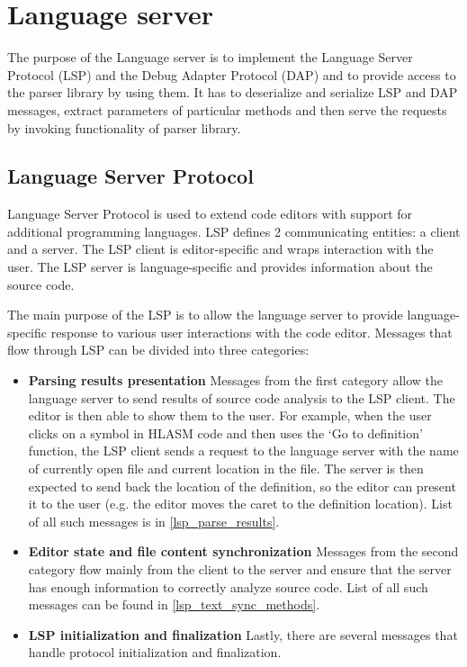 \chapter{Language server}
\label{chap:lang_server}
The purpose of the Language server is to implement the Language Server Protocol (LSP) and the Debug Adapter Protocol (DAP) and to provide access to the parser library by using them. It has to deserialize and serialize LSP and DAP messages, extract parameters of particular methods and then serve the requests by invoking functionality of parser library.

\section{Language Server Protocol}
Language Server Protocol is used to extend code editors with support for additional programming languages. LSP defines 2 communicating entities: a client and a server. The LSP client is editor-specific and wraps interaction with the user. The LSP server is language-specific and provides information about the source code.

The main purpose of the LSP is to allow the language server to provide language-specific response to various user interactions with the code editor. Messages that flow through LSP can be divided into three categories:

\begin{itemize}
	\item \textbf{Parsing results presentation} Messages from the first category allow the language server to send results of source code analysis to the LSP client. The editor is then able to show them to the user. For example, when the user clicks on a symbol in HLASM code and then uses the `Go to definition' function, the LSP client sends a request to the language server with the name of currently open file and current location in the file. The server is then expected to send back the location of the definition, so the editor can present it to the user (e.g. the editor moves the caret to the definition location). List of all such messages is in \cref{lsp_parse_results}.

	\item \textbf{Editor state and file content synchronization} Messages from the second category flow mainly from the client to the server and ensure that the server has enough information to correctly analyze source code. List of all such messages can be found in \cref{lsp_text_sync_methods}.
	
	\item \textbf{LSP initialization and finalization} Lastly, there are several messages that handle protocol initialization and finalization.
\end{itemize}


